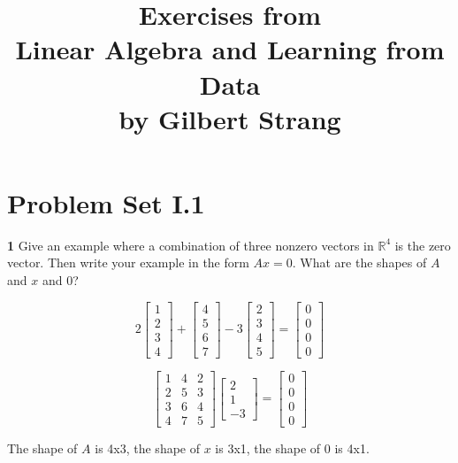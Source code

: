\documentclass{article}
\title{Exercises from \\
  Linear Algebra and Learning from Data\\
  by Gilbert Strang
}
\newcounter{prblm}
\newcommand{\problemset}[1]{\setcounter{prblm}{0}\section*{#1}}
\begin{document}
\maketitle

\problemset{Problem Set I.1}


\noindent\textbf{1} Give an example where a combination of three nonzero vectors in $\mathbb{R}^4$ is the zero 
vector. Then write your example in the form $Ax = 0$. What are the shapes of $A$ and
$x$ and 0?

\begin{displaymath}
2 \begin{bmatrix} 1 \\ 2 \\ 3 \\ 4 \end{bmatrix}
+ \begin{bmatrix} 4 \\ 5 \\ 6 \\ 7 \end{bmatrix}
- 3 \begin{bmatrix} 2 \\ 3 \\ 4 \\ 5 \end{bmatrix}
= \begin{bmatrix} 0 \\ 0 \\ 0 \\ 0 \end{bmatrix}
\end{displaymath}

\begin{displaymath}
\begin{bmatrix} 1 & 4 & 2 \\ 2 & 5 & 3 \\ 3 & 6 & 4 \\ 4 & 7 & 5 \end{bmatrix}
\begin{bmatrix} 2 \\ 1 \\ -3 \end{bmatrix}
= \begin{bmatrix} 0 \\ 0 \\ 0 \\ 0 \end{bmatrix}
\end{displaymath}

The shape of $A$ is 4x3, the shape of $x$ is 3x1, the shape of 0 is 4x1.
\end{document}
